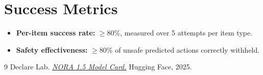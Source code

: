 \documentclass[11.5pt,a4paper]{article}
\begin{document}
\section*{Success Metrics}
\begin{itemize}
\item \textbf{Per-item success rate:} $\geq$80\%, measured over 5 attempts per item type.
\item \textbf{Safety effectiveness:} $\geq$80\% of unsafe predicted actions correctly withheld.
\end{itemize}

{\normalsize

\begin{thebibliography}{9}
\setlength{\itemsep}{4pt}
 Declare Lab. \href{https://huggingface.co/declare-lab/nora-1.5}{\emph{NORA 1.5 Model Card.}} Hugging Face, 2025.
\end{thebibliography}
}
\end{document}
